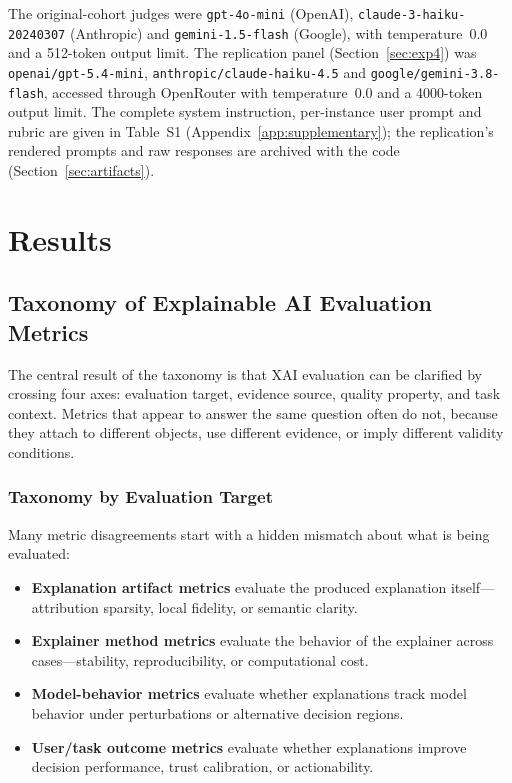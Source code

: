 \documentclass[10pt,a4paper,twoside]{article}
\begin{document}
The original-cohort judges were \texttt{gpt-4o-mini} (OpenAI),
\texttt{claude-3-haiku-20240307} (Anthropic) and \texttt{gemini-1.5-flash}
(Google), with temperature~0.0 and a 512-token output limit. The replication
panel (Section~\ref{sec:exp4}) was \texttt{openai/gpt-5.4-mini},
\texttt{anthropic/claude-haiku-4.5} and \texttt{google/gemini-3.8-flash},
accessed through OpenRouter with temperature~0.0 and a 4000-token output
limit. The complete system instruction, per-instance user prompt and rubric
are given in Table~S1 (Appendix~\ref{app:supplementary}); the replication's rendered
prompts and raw responses are archived with the code (Section~\ref{sec:artifacts}).


\section{Results}
\label{sec:results_all}


\subsection{Taxonomy of Explainable AI Evaluation Metrics}
\label{sec:taxonomy}

The central result of the taxonomy is that XAI evaluation can be
clarified by crossing four axes: evaluation target, evidence source,
quality property, and task context. Metrics that appear to answer the
same question often do not, because they attach to different objects, use
different evidence, or imply different validity conditions.

\subsubsection{Taxonomy by Evaluation Target}

Many metric disagreements start with a hidden mismatch about what is
being evaluated:
\begin{itemize}[leftmargin=*]
\item \textbf{Explanation artifact metrics} evaluate the produced
explanation itself---attribution sparsity, local fidelity, or semantic
clarity.
\item \textbf{Explainer method metrics} evaluate the behavior of the
explainer across cases---stability, reproducibility, or computational
cost.
\item \textbf{Model-behavior metrics} evaluate whether explanations track
model behavior under perturbations or alternative decision regions.
\item \textbf{User/task outcome metrics} evaluate whether explanations
improve decision performance, trust calibration, or actionability.
\end{itemize}
\end{document}

